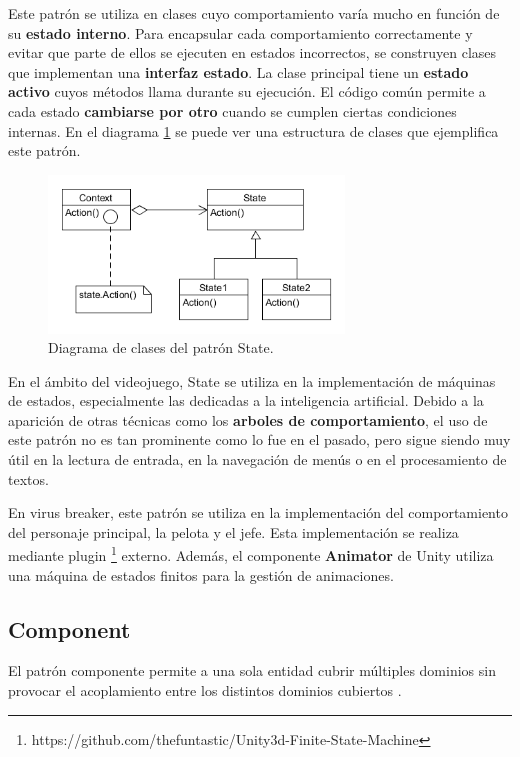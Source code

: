 Este patrón se utiliza en clases cuyo comportamiento varía mucho en función de su \textbf{estado interno}. Para encapsular cada comportamiento correctamente y evitar que parte de ellos se ejecuten en estados incorrectos, se construyen clases que implementan una \textbf{interfaz estado}. La clase principal tiene un \textbf{estado activo} cuyos métodos llama durante su ejecución. El código común permite a cada estado \textbf{cambiarse por otro} cuando se cumplen ciertas condiciones internas. En el diagrama \ref{state_diagram} se puede ver una estructura de clases que ejemplifica este patrón.
\begin{figure}[h]
	\includegraphics[width=0.7\textwidth]{images/estructura/patrones/state}
	\centering
	\caption{Diagrama de clases del patrón State.}
	\label{state_diagram}
\end{figure}

En el ámbito del videojuego, State se utiliza en la implementación de máquinas de estados, especialmente las dedicadas a la inteligencia artificial. Debido a la aparición de otras técnicas como los \textbf{arboles de comportamiento}, el uso de este patrón no es tan prominente como lo fue en el pasado, pero sigue siendo muy útil en la lectura de entrada, en la navegación de menús o en el procesamiento de textos.
 
En virus breaker, este patrón se utiliza en la implementación del comportamiento del personaje principal, la pelota y el jefe. Esta implementación se realiza mediante plugin \footnote{https://github.com/thefuntastic/Unity3d-Finite-State-Machine} externo. Además, el componente \textbf{Animator} de Unity utiliza una máquina de estados finitos para la gestión de animaciones.

\subsection{Component}
El patrón componente permite a una sola entidad cubrir múltiples dominios sin provocar el acoplamiento entre los distintos dominios cubiertos \cite{game_programming_patterns}.

